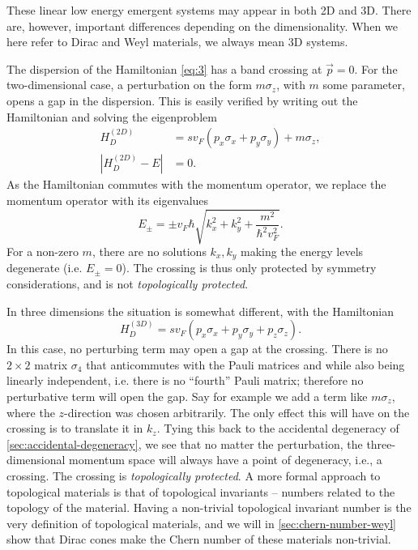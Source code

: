 These linear low energy emergent systems may appear in both 2D and 3D.
There are, however, important differences depending on the dimensionality.
When we here refer to Dirac and Weyl materials, we always mean 3D systems.

\label{sec:stability-of-gap}
The dispersion of the Hamiltonian \eqref{eq:3} has a band crossing at  $\vec{p} = 0$.
For the two-dimensional case, a perturbation on the form $m \sigma_z$, with $m$ some parameter, opens a gap in the dispersion.
This is easily verified by writing out the Hamiltonian and solving the eigenproblem
\begin{align}
  H_D^{(2D)} &= s v_{F} (p_x \sigma_x + p_y \sigma_y) + m \sigma_z,\\
  \left|
  H_D^{(2D)} - E
  \right| &= 0.
\end{align}
As the Hamiltonian commutes with the momentum operator, we replace the momentum operator with its eigenvalues
\begin{equation}
E_{\pm} = \pm v_F \hbar \sqrt{k_x^2 + k_y^2 + \frac{m^2}{\hbar ^2 v_{F}^2}}.
\end{equation}
For a non-zero \( m \), there are no solutions $k_x, k_y$ making the energy levels degenerate (i.e. \( E_{\pm} = 0 \)).
The crossing is thus only protected by symmetry considerations, and is not \emph{topologically protected}.


In three dimensions the situation is somewhat different, with the Hamiltonian  
\begin{equation}
  H_D^{(3D)} = s v_F ( p_x \sigma_x + p_y \sigma_y + p_z \sigma_z).
\end{equation}
In this case, no perturbing term may open a gap at the crossing.
There is no $2\times 2$ matrix $\sigma_4$ that anticommutes with the Pauli matrices and while also being linearly independent, i.e. there is no ``fourth'' Pauli matrix;
therefore no perturbative term will open the gap.
Say for example we add a term like $m \sigma_z$, where the $z$-direction was chosen arbitrarily.
The only effect this will have on the crossing is to translate it in $k_z$.
Tying this back to the accidental degeneracy of \cref{sec:accidental-degeneracy}, we see that no matter the perturbation, the three-dimensional momentum space will always have a point of degeneracy, i.e., a crossing.
The crossing is \emph{topologically protected}.
A more formal approach to topological materials is that of topological invariants -- numbers related to the topology of the material.
Having a non-trivial topological invariant number is the very definition of topological materials, and we will in \cref{sec:chern-number-weyl} show that Dirac cones make the Chern number of these materials non-trivial.

